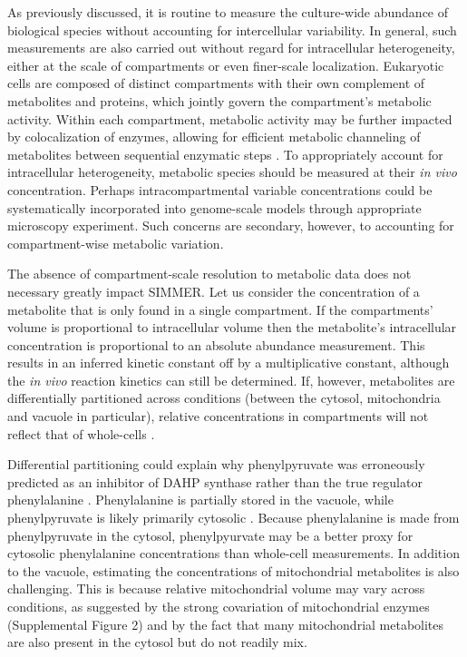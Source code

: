 As previously discussed, it is routine to measure the culture-wide abundance of biological species without accounting for intercellular variability. In general, such measurements are also carried out without regard for intracellular heterogeneity, either at the scale of compartments or even finer-scale localization. Eukaryotic cells are composed of distinct compartments with their own complement of metabolites and proteins, which jointly govern the compartment's metabolic activity. Within each compartment, metabolic activity may be further impacted by colocalization of enzymes, allowing for efficient metabolic channeling of metabolites between sequential enzymatic steps \cite{Ovadi:1995wy}. To appropriately account for intracellular heterogeneity, metabolic species should be measured at their \textit{in vivo} concentration. Perhaps intracompartmental variable concentrations could be systematically incorporated into genome-scale models through appropriate microscopy experiment. Such concerns are secondary, however, to accounting for compartment-wise metabolic variation.

The absence of compartment-scale resolution to metabolic data does not necessary greatly impact SIMMER. Let us consider the concentration of a metabolite that is only found in a single compartment. If the compartments' volume is proportional to intracellular volume then the metabolite's intracellular concentration is proportional to an absolute abundance measurement. This results in an inferred kinetic constant off by a multiplicative constant, although the \textit{in vivo} reaction kinetics can still be determined. If, however, metabolites are differentially partitioned across conditions (between the cytosol, mitochondria and vacuole in particular), relative concentrations in compartments will not reflect that of whole-cells \cite{Kitamoto:1988wc}.

Differential partitioning could explain why phenylpyruvate was erroneously predicted as an inhibitor of DAHP synthase rather than the true regulator phenylalanine \cite{Schnappauf:1998ec}. Phenylalanine is partially stored in the vacuole, while phenylpyruvate is likely primarily cytosolic \cite{Kitamoto:1988wc}. Because phenylalanine is made from phenylpyruvate in the cytosol, phenylpyurvate may be a better proxy for cytosolic phenylalanine concentrations than whole-cell measurements. In addition to the vacuole, estimating the concentrations of mitochondrial metabolites is also challenging. This is because relative mitochondrial volume may vary across conditions, as suggested by the strong covariation of mitochondrial enzymes (Supplemental Figure 2) and by the fact that many mitochondrial metabolites are also present in the cytosol but do not readily mix.  

